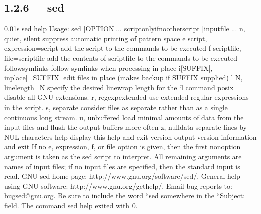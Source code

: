 \documentclass[letterpaper,12pt,english]{sphinxmanual}
\begin{document}
\subsection{1.2.6   sed}
\label{\detokenize{001software/001install/linux:sed}}
\begin{sphinxVerbatim}[commandchars=\\\{\}]
0.01s\PYGZdl{} sed \PYGZhy{}\PYGZhy{}help
Usage: sed [OPTION]... \PYGZob{}script\PYGZhy{}only\PYGZhy{}if\PYGZhy{}no\PYGZhy{}other\PYGZhy{}script\PYGZcb{} [input\PYGZhy{}file]...
  \PYGZhy{}n, \PYGZhy{}\PYGZhy{}quiet, \PYGZhy{}\PYGZhy{}silent
                 suppress automatic printing of pattern space
  \PYGZhy{}e script, \PYGZhy{}\PYGZhy{}expression=script
                 add the script to the commands to be executed
  \PYGZhy{}f script\PYGZhy{}file, \PYGZhy{}\PYGZhy{}file=script\PYGZhy{}file
                 add the contents of script\PYGZhy{}file to the commands to be executed
  \PYGZhy{}\PYGZhy{}follow\PYGZhy{}symlinks
                 follow symlinks when processing in place
  \PYGZhy{}i[SUFFIX], \PYGZhy{}\PYGZhy{}in\PYGZhy{}place[=SUFFIX]
                 edit files in place (makes backup if SUFFIX supplied)
  \PYGZhy{}l N, \PYGZhy{}\PYGZhy{}line\PYGZhy{}length=N
                 specify the desired line\PYGZhy{}wrap length for the `l\PYGZsq{} command
  \PYGZhy{}\PYGZhy{}posix
                 disable all GNU extensions.
  \PYGZhy{}r, \PYGZhy{}\PYGZhy{}regexp\PYGZhy{}extended
                 use extended regular expressions in the script.
  \PYGZhy{}s, \PYGZhy{}\PYGZhy{}separate
                 consider files as separate rather than as a single continuous
                 long stream.
  \PYGZhy{}u, \PYGZhy{}\PYGZhy{}unbuffered
                 load minimal amounts of data from the input files and flush
                 the output buffers more often
  \PYGZhy{}z, \PYGZhy{}\PYGZhy{}null\PYGZhy{}data
                 separate lines by NUL characters
      \PYGZhy{}\PYGZhy{}help     display this help and exit
      \PYGZhy{}\PYGZhy{}version  output version information and exit
If no \PYGZhy{}e, \PYGZhy{}\PYGZhy{}expression, \PYGZhy{}f, or \PYGZhy{}\PYGZhy{}file option is given, then the first
non\PYGZhy{}option argument is taken as the sed script to interpret.  All
remaining arguments are names of input files; if no input files are
specified, then the standard input is read.
GNU sed home page: \PYGZlt{}http://www.gnu.org/software/sed/\PYGZgt{}.
General help using GNU software: \PYGZlt{}http://www.gnu.org/gethelp/\PYGZgt{}.
E\PYGZhy{}mail bug reports to: \PYGZlt{}bug\PYGZhy{}sed@gnu.org\PYGZgt{}.
Be sure to include the word ``sed\PYGZsq{}\PYGZsq{} somewhere in the ``Subject:\PYGZsq{}\PYGZsq{} field.
The command \PYGZdq{}sed \PYGZhy{}\PYGZhy{}help\PYGZdq{} exited with 0.
\end{sphinxVerbatim}
\end{document}
